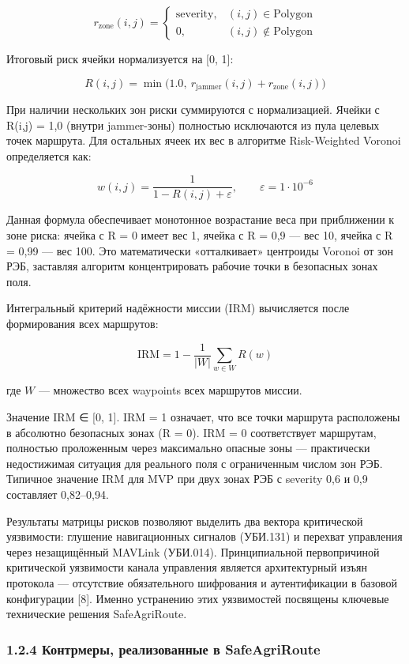 \documentclass[14pt,a4paper]{extarticle}
\begin{document}
\[r_{\mathrm{zone}}(i,j) = \begin{cases} \mathrm{severity}, & (i,j) \in \mathrm{Polygon} \\ 0, & (i,j) \notin \mathrm{Polygon} \end{cases}\]

Итоговый риск ячейки нормализуется на {[}0, 1{]}:

\[R(i,j) = \min\!\bigl(1.0,\ r_{\mathrm{jammer}}(i,j) + r_{\mathrm{zone}}(i,j)\bigr)\]

При наличии нескольких зон риски суммируются с нормализацией. Ячейки с R(i,j) = 1,0 (внутри jammer-зоны) полностью исключаются из пула целевых точек маршрута. Для остальных ячеек их вес в алгоритме Risk-Weighted Voronoi определяется как:

\[w(i,j) = \frac{1}{1 - R(i,j) + \varepsilon},\qquad \varepsilon = 1 \cdot 10^{-6}\]

Данная формула обеспечивает монотонное возрастание веса при приближении к зоне риска: ячейка с R = 0 имеет вес 1, ячейка с R = 0,9 --- вес 10, ячейка с R = 0,99 --- вес 100. Это математически «отталкивает» центроиды Voronoi от зон РЭБ, заставляя алгоритм концентрировать рабочие точки в безопасных зонах поля.

Интегральный критерий надёжности миссии (IRM) вычисляется после формирования всех маршрутов:

\[\mathrm{IRM} = 1 - \frac{1}{|W|}\sum_{w \in W} R(w)\]

где \(W\) --- множество всех waypoints всех маршрутов миссии.

Значение IRM ∈ {[}0, 1{]}. IRM = 1 означает, что все точки маршрута расположены в абсолютно безопасных зонах (R = 0). IRM = 0 соответствует маршрутам, полностью проложенным через максимально опасные зоны --- практически недостижимая ситуация для реального поля с ограниченным числом зон РЭБ. Типичное значение IRM для MVP при двух зонах РЭБ с severity 0,6 и 0,9 составляет 0,82--0,94.

Результаты матрицы рисков позволяют выделить два вектора критической уязвимости: глушение навигационных сигналов (УБИ.131) и перехват управления через незащищённый MAVLink (УБИ.014). Принципиальной первопричиной критической уязвимости канала управления является архитектурный изъян протокола --- отсутствие обязательного шифрования и аутентификации в базовой конфигурации {[}8{]}. Именно устранению этих уязвимостей посвящены ключевые технические решения SafeAgriRoute.

\hypertarget{ux43aux43eux43dux442ux440ux43cux435ux440ux44b-ux440ux435ux430ux43bux438ux437ux43eux432ux430ux43dux43dux44bux435-ux432-safeagriroute}{%
\subsubsection{1.2.4 Контрмеры, реализованные в SafeAgriRoute}\label{ux43aux43eux43dux442ux440ux43cux435ux440ux44b-ux440ux435ux430ux43bux438ux437ux43eux432ux430ux43dux43dux44bux435-ux432-safeagriroute}}
\end{document}
